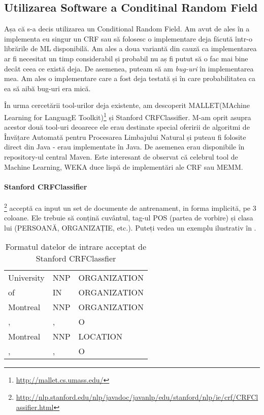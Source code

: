 \subsection{Utilizarea Software a Conditinal Random Field}
\label{sub-sec:crf-software}

Așa că s-a decis utilizarea un Conditional Random Field. Am avut de ales în a implementa eu singur un CRF sau să folosesc o implementare deja făcută într-o librările de ML disponibilă. Am ales a doua variantă din cauză ca implementarea ar fi necesitat un timp considerabil și probabil nu aș fi putut să o fac mai bine decât ceea ce există deja. De asemenea, puteam să am \textit{bug-uri} în implementarea mea. Am ales o implementare care a fost deja testată și în care probabilitatea ca ea să aibă bug-uri era mică.


În urma cercetării tool-urilor deja existente, am descoperit MALLET(MAchine Learning for LanguagE Toolkit)\footnote{\url{http://mallet.cs.umass.edu/}} și Stanford CRFClassifier. M-am oprit asupra acestor două tool-uri deoarece ele erau destinate special oferirii de algoritmi de Învățare Automată pentru Procesarea Limbajului Natural și puteau fi folosite direct din Java - erau implementate în Java. De asemenea erau disponibile în repository-ul central Maven. Este interesant de observat că celebrul tool de Machine Learning, WEKA duce lispă de implementări ale CRF sau MEMM. 


\paragraph{Stanford CRFClassifier}\footnote{\url{http://nlp.stanford.edu/nlp/javadoc/javanlp/edu/stanford/nlp/ie/crf/CRFClassifier.html}} acceptă ca input un set de documente de antrenament, in forma implicită, pe 3 coloane. Ele trebuie să conțină cuvântul, tag-ul POS (partea de vorbire) și clasa lui (PERSOANĂ, ORGANIZAȚIE, etc.). Puteți vedea un exemplu ilustrativ în .

\begin{center}
\begin{table}[htb]
  \caption{Formatul datelor de intrare acceptat de Stanford CRFClassfier}
  \begin{tabular}{l l l}
   University & NNP & ORGANIZATION \\
   of & IN & ORGANIZATION \\
   Montreal & NNP & ORGANIZATION \\
   ,& , & O \\
   Montreal & NNP & LOCATION\\
   ,& ,& O\\
  \end{tabular}
  \label{table:input-crf}
\end{table}
\end{center}

